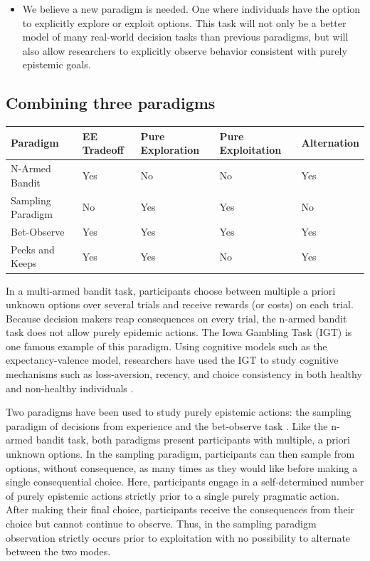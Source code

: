 \documentclass[a4paper,doc,natbib,floatsintext]{apa6}\usepackage[]{graphicx}\usepackage[]{color}
\begin{document}
\begin{itemize}
  \item We believe a new paradigm is needed. One where individuals have the option to explicitly explore or exploit options. This task will not only be a better model of many real-world decision tasks than previous paradigms, but will also allow researchers to explicitly observe behavior consistent with purely epistemic goals.

\end{itemize}

\subsection{Combining three paradigms}


\begin{center}
    \begin{tabular}{ | l | l | l | l | l |}
    \hline
    Paradigm & EE Tradeoff & Pure Exploration & Pure Exploitation & Alternation \\ \hline
    N-Armed Bandit & Yes & No & No & Yes\\ \hline
    Sampling Paradigm & No & Yes & Yes & No\\ \hline
    Bet-Observe & Yes & Yes & Yes & Yes\\ \hline
    Peeks and Keeps & Yes & Yes & No & Yes\\ \hline
    \hline
    \end{tabular}
\end{center}


In a multi-armed bandit task, participants choose between multiple a priori unknown options over several trials and receive rewards (or costs) on each trial. Because decision makers reap consequences on every trial, the n-armed bandit task does not allow purely epidemic actions. The Iowa Gambling Task (IGT) is one famous example of this paradigm. Using cognitive models such as the expectancy-valence model, researchers have used the IGT to study cognitive mechanisms such as loss-aversion, recency, and choice consistency in both healthy and non-healthy individuals \citep{yechiam2005models}.

Two paradigms have been used to study purely epistemic actions: the sampling paradigm of decisions from experience \citep{hertwig2004decisions} and the bet-observe task \citep{tversky1966information}. Like the n-armed bandit task, both paradigms present participants with multiple, a priori unknown options. In the sampling paradigm, participants can then sample from options, without consequence, as many times as they would like before making a single consequential choice. Here, participants engage in a self-determined number of purely epistemic actions strictly prior to a single purely pragmatic action. After making their final choice, participants receive the consequences from their choice but cannot continue to observe. Thus, in the sampling paradigm observation strictly occurs prior to exploitation with no possibility to alternate between the two modes.
\end{document}
